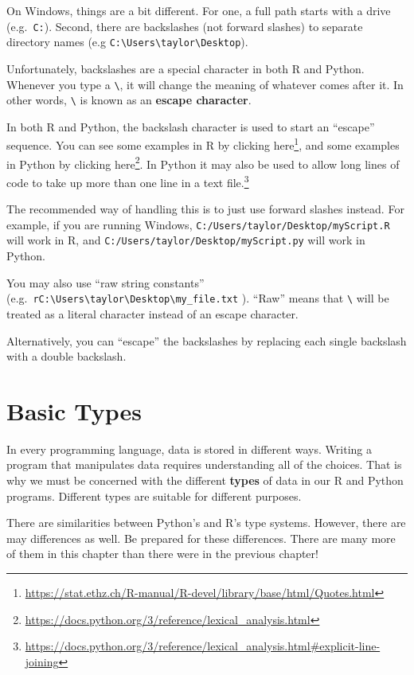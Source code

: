 \documentclass[
  12pt,
]{krantz}
\renewcommand{\href}[2]{#2\footnote{\url{#1}}}
\begin{document}
On Windows, things are a bit different. For one, a full path starts with a drive (e.g.~\texttt{C:}). Second, there are backslashes (not forward slashes) to separate directory names (e.g \texttt{C:\textbackslash{}Users\textbackslash{}taylor\textbackslash{}Desktop}).

Unfortunately, backslashes are a special character in both R and Python. Whenever you type a \texttt{\textbackslash{}}, it will change the meaning of whatever comes after it. In other words, \texttt{\textbackslash{}} is known as an \textbf{escape character}.

In both R and Python, the backslash character is used to start an ``escape'' sequence. You can see some examples in R by clicking \href{https://stat.ethz.ch/R-manual/R-devel/library/base/html/Quotes.html}{here}, and some examples in Python by clicking \href{https://docs.python.org/3/reference/lexical_analysis.html}{here}. In Python it may also be used to \href{https://docs.python.org/3/reference/lexical_analysis.html\#explicit-line-joining}{allow long lines of code to take up more than one line in a text file.}

The recommended way of handling this is to just use forward slashes instead. For example, if you are running Windows, \texttt{C:/Users/taylor/Desktop/myScript.R} will work in R, and \texttt{C:/Users/taylor/Desktop/myScript.py} will work in Python.

You may also use ``raw string constants'' (e.g.~\texttt{r\textquotesingle{}C:\textbackslash{}Users\textbackslash{}taylor\textbackslash{}Desktop\textbackslash{}my\_file.txt\textquotesingle{}} ). ``Raw'' means that \texttt{\textbackslash{}} will be treated as a literal character instead of an escape character.

Alternatively, you can ``escape'' the backslashes by replacing each single backslash with a double backslash.

\hypertarget{basic-types}{%
\chapter{Basic Types}\label{basic-types}}

In every programming language, data is stored in different ways. Writing a program that manipulates data requires understanding all of the choices. That is why we must be concerned with the different \textbf{types} of data in our R and Python programs. Different types are suitable for different purposes.

There are similarities between Python's and R's type systems. However, there are may differences as well. Be prepared for these differences. There are many more of them in this chapter than there were in the previous chapter!
\end{document}
